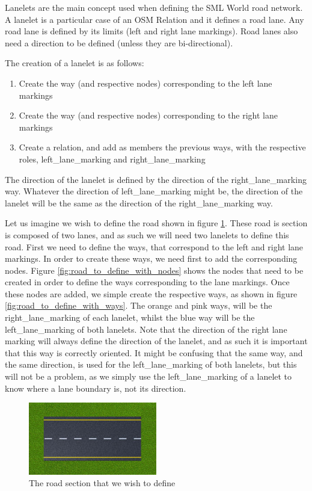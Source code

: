 Lanelets are the main concept used when defining the SML World road network. A lanelet is a particular case of an OSM Relation and it defines a road lane. Any road lane is defined by its limits (left and right lane markings). Road lanes also need a direction to be defined (unless they are bi-directional).

The creation of a lanelet is as follows:

\begin{enumerate}
\item Create the way (and respective nodes) corresponding to the left lane markings
\item Create the way (and respective nodes) corresponding to the right lane markings
\item Create a relation, and add as members the previous ways, with the respective roles, left\_lane\_marking and right\_lane\_marking
\end{enumerate}

The direction of the lanelet is defined by the direction of the right\_lane\_marking way. Whatever the direction of left\_lane\_marking might be, the direction of the lanelet will be the same as the direction of the right\_lane\_marking way.

Let us imagine we wish to define the road shown in figure \ref{fig:road_to_define}. These road is section is composed of two lanes, and as such we will need two lanelets to define this road. First we need to define the ways, that correspond to the left and right lane markings. In order to create these ways, we need first to add the corresponding nodes. Figure \ref{fig:road_to_define_with_nodes} shows the nodes that need to be created in order to define the ways corresponding to the lane markings. Once these nodes are added, we simple create the respective ways, as shown in figure \ref{fig:road_to_define_with_ways}. The orange and pink ways, will be the right\_lane\_marking of each lanelet, whilst the blue way will be the left\_lane\_marking of both lanelets. Note that the direction of the right lane marking will always define the direction of the lanelet, and as such it is important that this way is correctly oriented. It might be confusing that the same way, and the same direction, is used for the left\_lane\_marking of both lanelets, but this will not be a problem, as we simply use the left\_lane\_marking of a lanelet to know where a lane boundary is, not its direction.

\begin{figure}[h!]
  \centering
    \includegraphics[width=0.5\textwidth]{road_original}
    \caption{The road section that we wish to define \label{fig:road_to_define} }
\end{figure}

